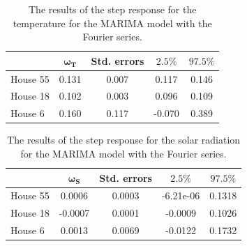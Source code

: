 \begin{table}[H]
    \centering
    \begin{tabular}{l|cccc}
    \hline
     & $\bm{\omega_{T}}$ & \textbf{Std. errors} & $\bm{2.5\%}$ & $\bm{97.5\%}$ \\ \hline \hline
    House 55 & 0.131 & 0.007 & 0.117 & 0.146 \\
    House 18 & 0.102 & 0.003 & 0.096 & 0.109 \\
    House 6  & 0.160 & 0.117 & -0.070 & 0.389\\
    \hline
    \end{tabular}
    \caption{The results of the step response for the temperature for the MARIMA model with the Fourier series.}
    \label{tab: result_temp}
 \end{table}

 \begin{table}[H]
    \centering
    \begin{tabular}{l|cccc}
    \hline
     & $\bm{\omega_S}$ & \textbf{Std. errors} & $\bm{2.5\%}$ & $\bm{97.5\%}$ \\ \hline \hline
    House 55 & 0.0006 & 0.0003 & -6.21e-06 & 0.1318 \\
    House 18 & -0.0007 & 0.0001 & -0.0009 & 0.1026 \\
    House 6  & 0.0013 & 0.0069 & -0.0122 & 0.1732 \\
    \hline
    \end{tabular}
    \caption{The results of the step response for the solar radiation for the MARIMA model with the Fourier series.}
    \label{tab: result_solar}
 \end{table}


